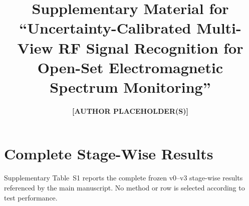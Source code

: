 \documentclass[journal,onecolumn]{IEEEtran}
\title{Supplementary Material for ``Uncertainty-Calibrated Multi-View RF Signal Recognition for Open-Set Electromagnetic Spectrum Monitoring''}
\author{\textbf{[AUTHOR PLACEHOLDER(S)]}}
\begin{document}
\maketitle

\section*{Complete Stage-Wise Results}

Supplementary Table~S1 reports the complete frozen v0--v3 stage-wise results referenced by the main manuscript. No method or row is selected according to test performance.


\end{document}
